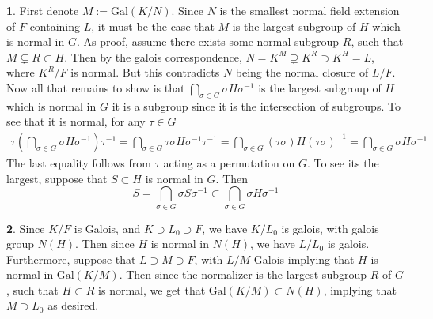 \documentclass[11pt]{article}
\theoremstyle{definition}
\newtheorem{pb}{}
\newcommand{\gal}{\text{Gal}}
\begin{document}
    \begin{pb}
        First denote \(M := \text{Gal}(K/N)\). Since \(N\) is the smallest normal field extension of \(F\) containing \(L\), it must be the case that
        \(M\) is the largest subgroup of \(H\) which is normal in \(G\). As proof, assume there exists some normal subgroup \(R\), such that \(M \subsetneq R \subset H\).
        Then by the galois correspondence, \(N = K^M \supsetneq K^R \supset K^H = L\), where \(K^R/F\) is normal. But this contradicts \(N\) being the normal closure of
        \(L/F\). Now all that remains to show is that \(\bigcap_{\sigma \in G} \sigma H \sigma^{-1}\) is the largest subgroup of \(H\) which is normal in \(G\)
        it is a subgroup since it is the intersection of subgroups.
        To see that it is normal, for any \(\tau \in G\) 
        \begin{align*}
            \tau \left(\bigcap_{\sigma \in G} \sigma H \sigma^{-1}\right) \tau^{-1} = \bigcap_{\sigma \in G} \tau \sigma H \sigma^{-1} \tau^{-1}
            = \bigcap_{\sigma \in G} (\tau \sigma) H (\tau \sigma)^{-1} = \bigcap_{\sigma \in G} \sigma H \sigma^{-1}
        \end{align*}
        The last equality follows from \(\tau\) acting as a permutation on \(G\). To see its the largest, suppose that \(S \subset H\) is normal in \(G\). Then 
        \[S = \bigcap_{\sigma \in G} \sigma S \sigma^{-1} \subset \bigcap_{\sigma \in G} \sigma H \sigma^{-1}\]
    \end{pb}
    \begin{pb}
        Since \(K/F\) is Galois, and \(K \supset L_0 \supset F\), we have \(K/L_0\) is galois, with galois group \(N(H)\). Then since \(H\) is normal in \(N(H)\), we have
        \(L/L_0\) is galois. Furthermore, suppose that \(L \supset M \supset F\), with \(L/M\) Galois implying that \(H\) is normal in \(\gal(K/M)\). Then since the normalizer is the largest subgroup \(R\)
        of \(G\), such that \(H \subset R\) is normal, we get that \(\gal(K/M) \subset N(H)\), implying that \(M \supset L_0\) as desired.
    \end{pb}
\end{document}
